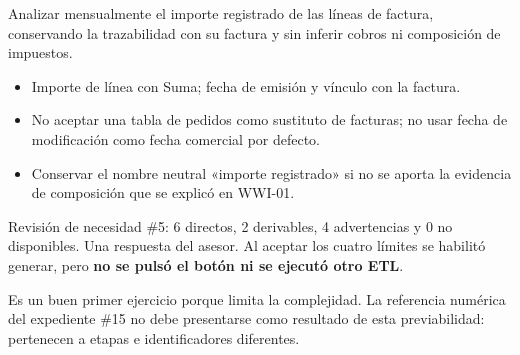 \label{wwi02}
\begin{goal}
Analizar mensualmente el importe registrado de las líneas de factura, conservando la trazabilidad con su factura y sin inferir cobros ni composición de impuestos.
\end{goal}
\begin{itemize}
\item Importe de línea con Suma; fecha de emisión y vínculo con la factura.
\item No aceptar una tabla de pedidos como sustituto de facturas; no usar fecha de modificación como fecha comercial por defecto.
\item Conservar el nombre neutral «importe registrado» si no se aporta la evidencia de composición que se explicó en WWI-01.
\end{itemize}
\begin{good}
Revisión de necesidad \#5: 6 directos, 2 derivables, 4 advertencias y 0 no disponibles. Una respuesta del asesor. Al aceptar los cuatro límites se habilitó generar, pero \textbf{no se pulsó el botón ni se ejecutó otro ETL}.
\end{good}
\begin{note}
Es un buen primer ejercicio porque limita la complejidad. La referencia numérica del expediente \#15 no debe presentarse como resultado de esta previabilidad: pertenecen a etapas e identificadores diferentes.
\end{note}

